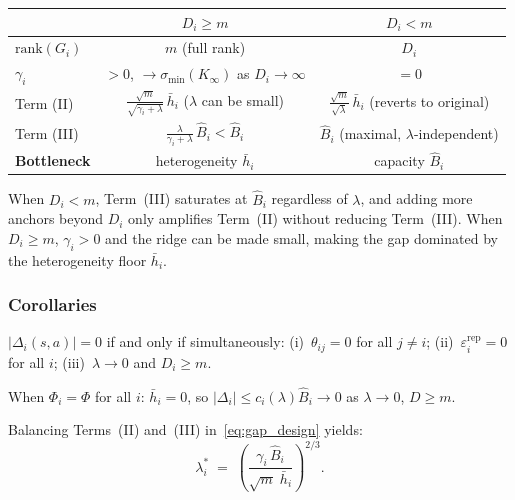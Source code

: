 \begin{center}
\renewcommand{\arraystretch}{1.3}
\small
\begin{tabular}{lcc}
\toprule
 & $D_i \geq m$ & $D_i < m$ \\
\midrule
$\mathrm{rank}(G_i)$
 & $m$ (full rank)
 & $D_i$ \\
$\gamma_i$
 & $> 0$, $\to \sigma_{\min}(K_\infty)$ as $D_i\!\to\!\infty$
 & $= 0$ \\
Term (II)
 & $\frac{\sqrt{m}}{\sqrt{\gamma_i+\lambda}}\,\bar{h}_i$
   \;($\lambda$ can be small)
 & $\frac{\sqrt{m}}{\sqrt{\lambda}}\,\bar{h}_i$
   \;(reverts to original) \\
Term (III)
 & $\frac{\lambda}{\gamma_i+\lambda}\,\hat{B}_i
   < \hat{B}_i$
 & $\hat{B}_i$ \;(maximal, $\lambda$-independent) \\
\textbf{Bottleneck}
 & heterogeneity $\bar{h}_i$
 & capacity $\hat{B}_i$ \\
\bottomrule
\end{tabular}
\end{center}

When $D_i < m$, Term~(III) saturates at $\hat{B}_i$
regardless of $\lambda$, and adding more anchors
beyond $D_i$ only amplifies Term~(II) without
reducing Term~(III).
When $D_i \geq m$, $\gamma_i > 0$ and the ridge
can be made small, making the gap dominated by
the heterogeneity floor $\bar{h}_i$.

\subsubsection{Corollaries}

\begin{corollary}
\label{cor:floor}
$|\Delta_i(s,a)|=0$ if and only if simultaneously:
\textup{(i)}~$\theta_{ij}=0$ for all $j\neq i$;
\textup{(ii)}~$\varepsilon_i^{\mathrm{rep}}=0$ for all $i$;
\textup{(iii)}~$\lambda\to 0$ and $D_i \geq m$.
\end{corollary}

\begin{corollary}
\label{cor:homogeneous}
When $\Phi_i=\Phi$ for all $i$:
$\bar{h}_i = 0$, so
$|\Delta_i| \leq c_i(\lambda)\hat{B}_i \to 0$
as $\lambda\to 0$, $D \geq m$.
\end{corollary}

\begin{corollary}
\label{cor:optimal_lambda}
Balancing Terms~(II) and~(III) in~\eqref{eq:gap_design}
yields:
\begin{equation}
    \lambda^*_i
    \;=\;
    \left(
    \frac{\gamma_i\,\hat{B}_i}
    {\sqrt{m}\;\bar{h}_i}
    \right)^{2/3}.
    \label{eq:lambda_star}
\end{equation}
\end{corollary}

